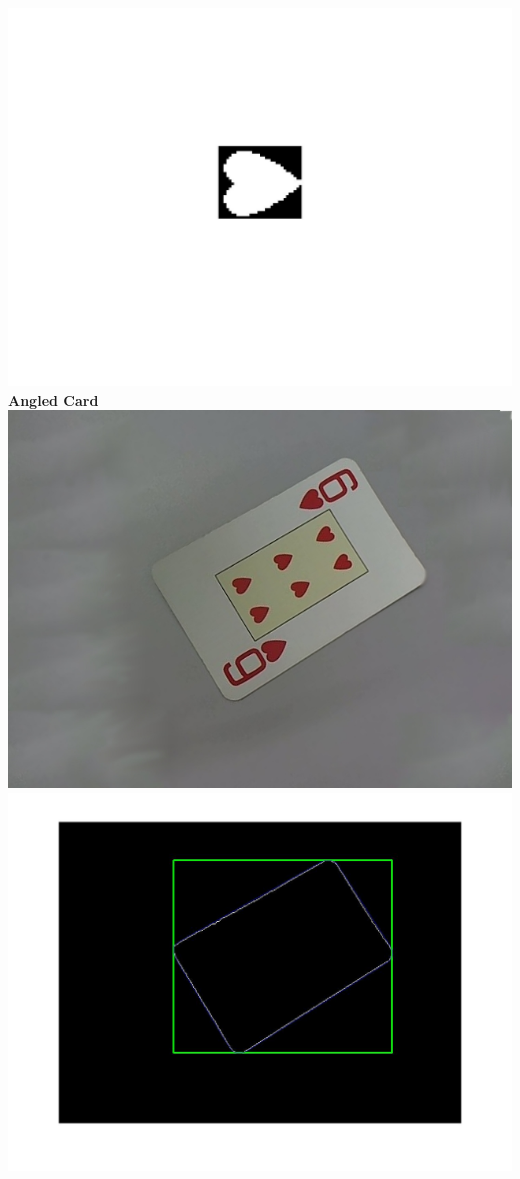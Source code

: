 \documentclass[11pt]{article}
\theoremstyle{plain}
\theoremstyle{definition}
\begin{document}
  \includegraphics[scale=0.07]{rotated_heart.jpg}
  \newline
   {\bf Angled Card}
 \newline
 \includegraphics[scale=0.1]{train18_1.jpg}
  \includegraphics[scale=0.07]{rotated_some_6_main.jpg}
\end{document}
